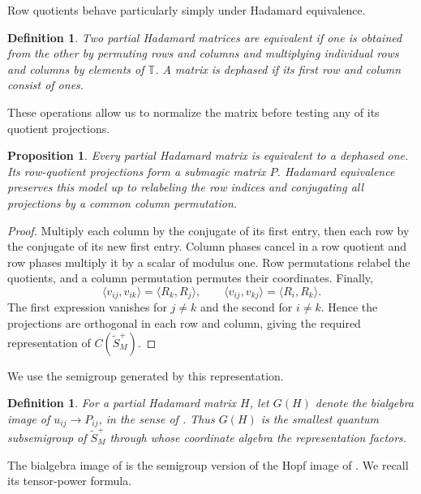 \documentclass[11pt,a4paper]{article}
\newtheorem{prop}[thm]{Proposition}
\newtheorem{defn}[thm]{Definition}
\begin{document}
Row quotients behave particularly simply under Hadamard equivalence.

\begin{defn}
Two partial Hadamard matrices are equivalent if one is obtained from the other by permuting rows and columns and multiplying individual rows and columns by elements of $\mathbb T$. A matrix is dephased if its first row and column consist of ones.
\end{defn}

These operations allow us to normalize the matrix before testing any of its quotient projections.

\begin{prop}\label{quotientmodel}
Every partial Hadamard matrix is equivalent to a dephased one. Its row-quotient projections form a submagic matrix $P$. Hadamard equivalence preserves this model up to relabeling the row indices and conjugating all projections by a common column permutation.
\end{prop}
\begin{proof}
Multiply each column by the conjugate of its first entry, then each row by the conjugate of its new first entry. Column phases cancel in a row quotient and row phases multiply it by a scalar of modulus one. Row permutations relabel the quotients, and a column permutation permutes their coordinates. Finally,
\[
 \langle v_{ij},v_{ik}\rangle=\langle R_k,R_j\rangle,\qquad
 \langle v_{ij},v_{kj}\rangle=\langle R_i,R_k\rangle .
\]
The first expression vanishes for $j\ne k$ and the second for $i\ne k$. Hence the projections are orthogonal in each row and column, giving the required representation of $C(\widetilde S_M^+)$.
\end{proof}

We use the semigroup generated by this representation.

\begin{defn}
For a partial Hadamard matrix $H$, let $G(H)$ denote the bialgebra image of $u_{ij}\to P_{ij}$, in the sense of \cite{bs}. Thus $G(H)$ is the smallest quantum subsemigroup of $\widetilde S_M^+$ through whose coordinate algebra the representation factors.
\end{defn}

The bialgebra image of \cite{bs} is the semigroup version of the Hopf image of \cite{bb}. We recall its tensor-power formula.
\end{document}
